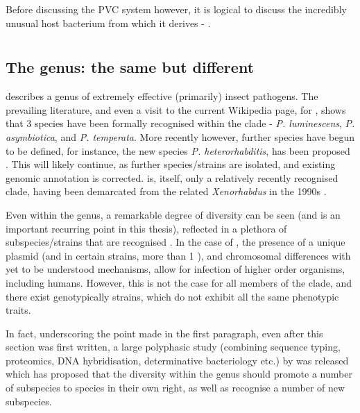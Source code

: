 Before discussing the PVC system however, it is logical to discuss the incredibly unusual host bacterium from which it derives - \Pa.

\section{\Pa}

\subsection{The \Pa{} genus: the same but different}
\Pa{} describes a genus of extremely effective (primarily) insect pathogens. The prevailing literature, and even a visit to the current Wikipedia page, for \Pa{}, shows that 3 species have been formally recognised within the clade - \textit{P. luminescens}, \textit{P. asymbiotica}, and \textit{P. temperata}. More recently however, further species have begun to be defined, for instance, the new species \textit{P. heterorhabditis}, has been proposed \citep{Naidoo2015}. This will likely continue, as further species/strains are isolated, and existing genomic annotation is corrected. \Pa{} is, itself, only a relatively recently recognised clade, having been demarcated from the related \emph{Xenorhabdus} in the 1990s \citep{Saux1999a,Boemare1993}.

Even within the genus, a remarkable degree of diversity can be seen (and is an important recurring point in this thesis), reflected in a plethora of subspecies/strains that are recognised \citep{Peat2010}. In the case of \Pasy, the presence of a unique plasmid (and in certain strains, more than 1 \citep{Wilkinson2010a}), and chromosomal differences with yet to be understood mechanisms, allow for infection of higher order organisms, including humans. However, this is not the case for all members of the \Pasy{} clade, and there exist genotypically \Pasy{} strains, which do not exhibit all the same phenotypic traits.

In fact, underscoring the point made in the first paragraph, even after this section was first written, a large polyphasic study (combining sequence typing, proteomics, DNA hybridisation, determinative bacteriology etc.) by \cite{Machado2018} was released which has proposed that the diversity within the genus should promote a number of subspecies to species in their own right, as well as recognise a number of new subspecies.

